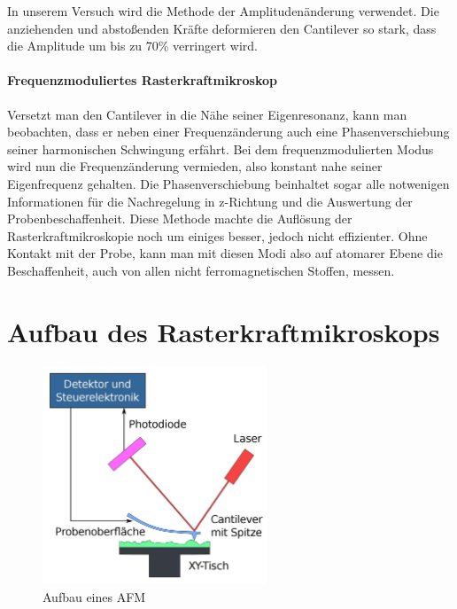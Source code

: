  In unserem Versuch wird die Methode der Amplitudenänderung verwendet. 
Die anziehenden und abstoßenden Kräfte deformieren den Cantilever so stark, dass die Amplitude um bis zu 70\% verringert wird.


       \paragraph{Frequenzmoduliertes Rasterkraftmikroskop}
       
Versetzt man den Cantilever in die Nähe seiner Eigenresonanz, kann man beobachten, dass er neben einer Frequenzänderung auch eine Phasenverschiebung seiner harmonischen Schwingung erfährt.
Bei dem frequenzmodulierten Modus wird nun die Frequenzänderung vermieden, also konstant nahe seiner Eigenfrequenz gehalten.
Die Phasenverschiebung beinhaltet sogar alle notwenigen Informationen für die Nachregelung in z-Richtung und die Auswertung der Probenbeschaffenheit.
Diese Methode machte die Auflösung der Rasterkraftmikroskopie noch um einiges besser, jedoch nicht effizienter.
Ohne Kontakt mit der Probe, kann man mit diesen Modi also auf atomarer Ebene die Beschaffenheit, auch von allen nicht ferromagnetischen Stoffen, messen.
 






       
 \section{Aufbau des Rasterkraftmikroskops}
\begin{figure}[h!]
    \centering
    \includegraphics[width=0.6\textwidth]{Abb/afm.jpg}
    \caption{Aufbau eines AFM}
    \label{afm}
\end{figure}

